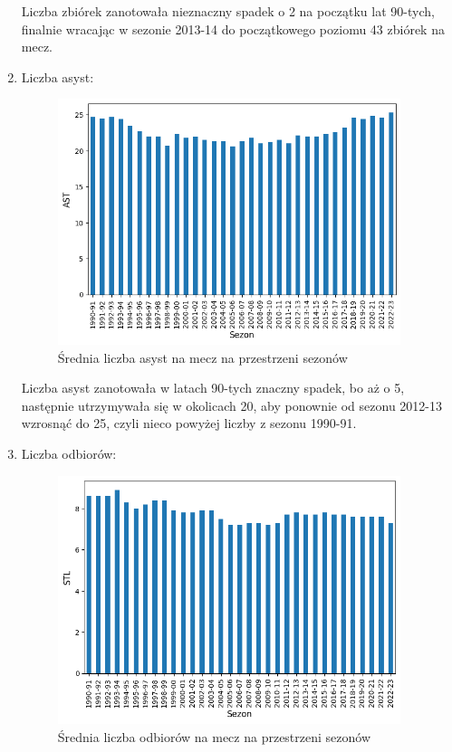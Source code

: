 \documentclass{article}
\begin{document}
\begin{enumerate}
        Liczba zbiórek zanotowała nieznaczny spadek o 2 na początku lat 90-tych, finalnie wracając w sezonie 2013-14 do początkowego poziomu 43 zbiórek na mecz.
 \newpage        
        \item Liczba asyst:
            \begin{figure}[H]
                \centering
                \includegraphics[width=10cm]{wykres_AST.png}
                \caption{Średnia liczba asyst na mecz na przestrzeni sezonów}
                \label{fig:wykres_AST}
            \end{figure}


        Liczba asyst zanotowała w latach 90-tych znaczny spadek, bo aż o 5, następnie utrzymywała się w okolicach 20, aby ponownie od sezonu 2012-13 wzrosnąć do 25, czyli nieco powyżej liczby z sezonu 1990-91.
  \newpage           
        \item Liczba odbiorów:
            \begin{figure}[H]
                \centering
                \includegraphics[width=10cm]{wykres_STL.png}
                \caption{Średnia liczba odbiorów na mecz na przestrzeni sezonów}
                \label{fig:wykres_STL}
            \end{figure}


\end{enumerate}
\end{document}
